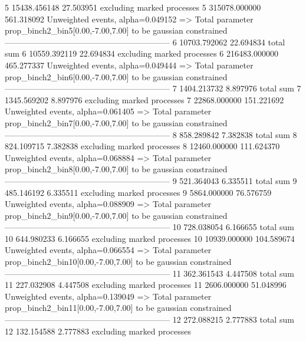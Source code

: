5          15438.456148    27.503951       excluding marked processes    
5          315078.000000   561.318092      Unweighted events, alpha=0.049152
  => Total parameter prop_binch2_bin5[0.00,-7.00,7.00] to be gaussian constrained
------------------------------------------------------------
6          10703.792062    22.694834       total sum                     
6          10559.392119    22.694834       excluding marked processes    
6          216483.000000   465.277337      Unweighted events, alpha=0.049444
  => Total parameter prop_binch2_bin6[0.00,-7.00,7.00] to be gaussian constrained
------------------------------------------------------------
7          1404.213732     8.897976        total sum                     
7          1345.569202     8.897976        excluding marked processes    
7          22868.000000    151.221692      Unweighted events, alpha=0.061405
  => Total parameter prop_binch2_bin7[0.00,-7.00,7.00] to be gaussian constrained
------------------------------------------------------------
8          858.289842      7.382838        total sum                     
8          824.109715      7.382838        excluding marked processes    
8          12460.000000    111.624370      Unweighted events, alpha=0.068884
  => Total parameter prop_binch2_bin8[0.00,-7.00,7.00] to be gaussian constrained
------------------------------------------------------------
9          521.364043      6.335511        total sum                     
9          485.146192      6.335511        excluding marked processes    
9          5864.000000     76.576759       Unweighted events, alpha=0.088909
  => Total parameter prop_binch2_bin9[0.00,-7.00,7.00] to be gaussian constrained
------------------------------------------------------------
10         728.038054      6.166655        total sum                     
10         644.980233      6.166655        excluding marked processes    
10         10939.000000    104.589674      Unweighted events, alpha=0.066554
  => Total parameter prop_binch2_bin10[0.00,-7.00,7.00] to be gaussian constrained
------------------------------------------------------------
11         362.361543      4.447508        total sum                     
11         227.032908      4.447508        excluding marked processes    
11         2606.000000     51.048996       Unweighted events, alpha=0.139049
  => Total parameter prop_binch2_bin11[0.00,-7.00,7.00] to be gaussian constrained
------------------------------------------------------------
12         272.088215      2.777883        total sum                     
12         132.154588      2.777883        excluding marked processes    
